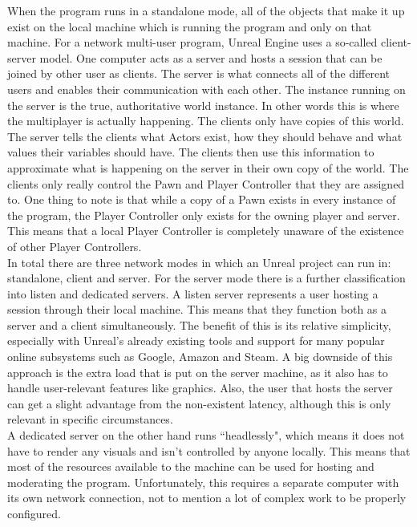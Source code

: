 When the program runs in a standalone mode, all of the objects that make it up exist on the local machine which is running the program and only on that machine. For a network multi-user program, Unreal Engine uses a so-called client-server model\cite{bib:NetworkComp}. One computer acts as a server and hosts a session that can be joined by other user as clients. The server is what connects all of the different users and enables their communication with each other. The instance running on the server is the true, authoritative world instance. In other words this is where the multiplayer is actually happening. The clients only have copies of this world. The server tells the clients what Actors exist, how they should behave and what values their variables should have. The clients then use this information to approximate what is happening on the server in their own copy of the world. The clients only really control the Pawn and Player Controller that they are assigned to. One thing to note is that while a copy of a Pawn exists in every instance of the program, the Player Controller only exists for the owning player and server. This means that a local Player Controller is completely unaware of the existence of other Player Controllers.\\

In total there are three network modes in which an Unreal project can run in: standalone, client and server\cite{bib:NetworkComp}. For the server mode there is a further classification into listen and dedicated servers. A listen server represents a user hosting a session through their local machine. This means that they function both as a server and a client simultaneously. The benefit of this is its relative simplicity, especially with Unreal's already existing tools and support for many popular online subsystems such as Google, Amazon and Steam\cite{bib:UEOnlSuS}. A big downside of this approach is the extra load that is put on the server machine, as it also has to handle user-relevant features like graphics. Also, the user that hosts the server can get a slight advantage from the non-existent latency, although this is only relevant in specific circumstances.\\
A dedicated server on the other hand runs ``headlessly", which means it does not have to render any visuals and isn't controlled by anyone locally. This means that most of the resources available to the machine can be used for hosting and moderating the program. Unfortunately, this requires a separate computer with its own network connection, not to mention a lot of complex work to be properly configured.\\

